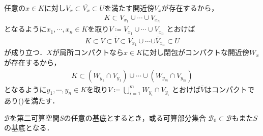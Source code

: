 	\begin{prf}
		任意の$x \in K$に対し$V_x \subset \overline{V_x} \subset U$を満たす開近傍$V_x$が存在するから，
		\begin{align}
			K \subset V_{x_1} \cup \cdots \cup V_{x_n}
		\end{align}
		となるように$x_1,\cdots,x_n \in K$を取り$V \coloneqq V_{x_1} \cup \cdots \cup V_{x_n}$
		とおけば
		\begin{align}
			K \subset V \subset \overline{V}
			\subset \overline{V_{x_1}} \cup \cdots \overline{\cup V_{x_n}}
			\subset U
		\end{align}
		が成り立つ．$X$が局所コンパクトなら$x \in K$に対し閉包がコンパクトな開近傍$W_x$が存在するから，
		\begin{align}
			K \subset (W_{y_1} \cap V_{y_1}) \cup \cdots \cup (W_{y_m} \cap V_{y_m})
		\end{align}
		となるように$y_1,\cdots,y_n \in K$を取り$V \coloneqq \bigcup_{i=1}^m W_{y_i} \cap V_{y_i}$
		とおけば$\overline{V}$はコンパクトであり()を満たす．
		\QED
	\end{prf}
	
	\begin{screen}
		\begin{thm}[可算コンパクト性の同値条件]
		\end{thm}
	\end{screen}
	
	\begin{screen}
		\begin{thm}[第二可算空間の任意の基底は可算基を含む]\label{thm:countable_base_of_second_countable_space}
			$\mathscr{B}$を第二可算空間$S$の任意の基底とするとき，或る可算部分集合
			$\mathscr{B}_0 \subset \mathscr{B}$もまた$S$の基底となる．
		\end{thm}
	\end{screen}
	
